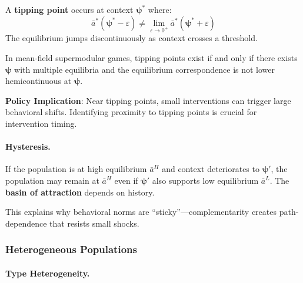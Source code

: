\begin{definition}
\label{def:tipping}
A \textbf{tipping point} occurs at context $\boldsymbol{\psi}^*$ where:
\begin{equation}
\bar{a}^*(\boldsymbol{\psi}^* - \varepsilon) \neq \lim_{\varepsilon \to 0^+} 
\bar{a}^*(\boldsymbol{\psi}^* + \varepsilon)
\end{equation}
The equilibrium jumps discontinuously as context crosses a threshold.
\end{definition}

\begin{theorem}
\label{thm:tipping}
In mean-field supermodular games, tipping points exist if and only if there 
exists $\boldsymbol{\psi}$ with multiple equilibria and the equilibrium 
correspondence is not lower hemicontinuous at $\boldsymbol{\psi}$.
\end{theorem}

\textbf{Policy Implication}: Near tipping points, small interventions can trigger 
large behavioral shifts. Identifying proximity to tipping points is crucial for 
intervention timing.

\paragraph{Hysteresis.}

\begin{proposition}
\label{prop:hysteresis}
If the population is at high equilibrium $\bar{a}^H$ and context deteriorates to 
$\boldsymbol{\psi}'$, the population may remain at $\bar{a}^H$ even if 
$\boldsymbol{\psi}'$ also supports low equilibrium $\bar{a}^L$. The \textbf{basin of 
attraction} depends on history.
\end{proposition}

This explains why behavioral norms are ``sticky''---complementarity creates 
path-dependence that resists small shocks.

\subsubsection{Heterogeneous Populations}

\paragraph{Type Heterogeneity.}


